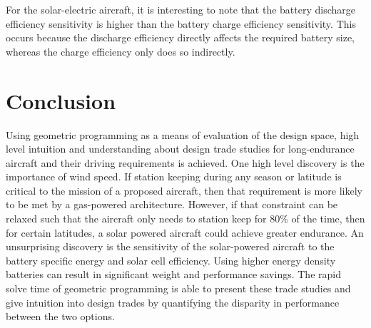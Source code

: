 For the solar-electric aircraft, it is interesting to note that the battery discharge efficiency sensitivity is higher than the battery charge efficiency sensitivity.
This occurs because the discharge efficiency directly affects the required battery size, whereas the charge efficiency only does so indirectly. 






\section{Conclusion}

Using geometric programming as a means of evaluation of the design space, high level intuition and understanding about design trade studies for long-endurance aircraft and their driving requirements is achieved.  
One high level discovery is the importance of wind speed.  
If station keeping during any season or latitude is critical to the mission of a proposed aircraft, then that requirement is more likely to be met by a gas-powered architecture.
However, if that constraint can be relaxed such that the aircraft only needs to station keep for 80\% of the time, then for certain latitudes, a solar powered aircraft could achieve greater endurance.
An unsurprising discovery is the sensitivity of the solar-powered aircraft to the battery specific energy and solar cell efficiency.  Using higher energy density batteries can result in significant weight and performance savings.  
The rapid solve time of geometric programming is able to present these trade studies and give intuition into design trades by quantifying the disparity in performance between the two options.





